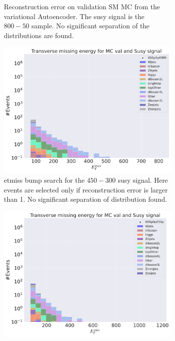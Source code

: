 \begin{figure}[h!]
\begin{subfigure}{.45\textwidth}
        \caption{Reconstruction error on validation SM MC from the variational Autoencoder. The susy signal is the $800-50$ sample. 
        No significant separation of the distributions are found. }
        \label{fig:vae_susy_800_50_recon}
    \end{subfigure}
    \hfill
    \begin{subfigure}{.45\textwidth}
        \includegraphics[width=\textwidth]{Figures/VAE_testing/small/b_data_recon_big_rm3_feats_sig_450p0p0300_etmiss.pdf}
        \caption{etmiss bump search for the $450-300$ susy signal. Here events are selected only if reconstruction error is larger than 1. No significant 
        separation of distribution found.}
        \label{fig:vae_susy_450_300_trilep}
    \end{subfigure}
    \hfill   
    \begin{subfigure}{.45\textwidth}
        \includegraphics[width=\textwidth]{Figures/VAE_testing/small/b_data_recon_big_rm3_feats_sig_800p0p050p_etmiss.pdf}

\end{subfigure}
\end{figure}
